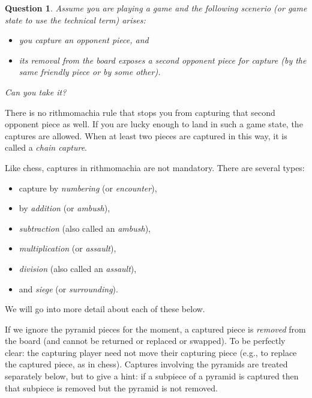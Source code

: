 \documentclass[12pt]{article}
\newtheorem{question}{Question}
\begin{document}
\begin{question}
Assume you are playing a game and the following scenerio (or game state to use the
technical term) arises:

\begin{itemize}
\item[(a)]
you capture an opponent piece, and

\item[(b)]
its removal from the board exposes a second opponent piece for capture
(by the same friendly piece or by some other).
\end{itemize}
Can you take it?
\end{question}

There is no rithmomachia rule that stops you from capturing that second opponent
piece as well. If you are lucky enough to land in such a game state, the captures
are allowed.
 When at least two pieces are captured in this way,
it is called a {\it chain capture}.

Like chess, captures in rithmomachia are not mandatory. There are several types:
\begin{itemize}
\item
capture by {\it numbering} (or {\it encounter}),
\item
by {\it addition} (or {\it ambush}),
\item
{\it subtraction} (also called an {\it ambush}),
\item
{\it multiplication} (or {\it assault}),
\item
{\it division} (also called an {\it assault}),
\item
and {\it siege} (or {\it surrounding}).
\end{itemize}
We will go into more detail about each of these below.

If we ignore the pyramid pieces for the moment,
a captured piece is {\it removed} from the board (and cannot be
returned or replaced or swapped). To be perfectly clear:
the capturing player need not move
their capturing piece (e.g., to replace the captured piece,
as in chess).
Captures involving the pyramids are treated separately below,
but to give a hint: if a subpiece of a pyramid is captured
then that subpiece is removed but the pyramid is not removed.
\end{document}
